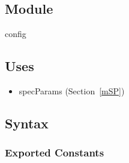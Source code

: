 \documentclass[12pt, titlepage]{article}
\begin{document}
\subsection{Module}

config

\subsection{Uses}
\begin{itemize}
\item specParams (Section~\ref{mSP})
\end{itemize}

\subsection{Syntax}

\subsubsection{Exported Constants}
\end{document}
